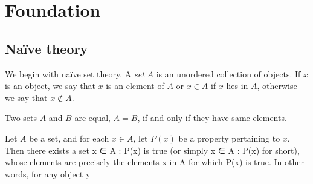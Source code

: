 
\chapter{Foundation}

\section{Na\"ive theory}

We begin with na\"ive set theory. A \emph{set} $A$ is an unordered collection of objects. If $x$ is an object, we say that $x$ is an element of $A$ or $x \in A$ if $x$ lies in $A$, otherwise we say that $x \notin A$.

\begin{axiom}[Extension]
    Two sets $A$ and $B$ are equal, $A = B$, if and only if they have same elements.
\end{axiom}

\begin{axiom}
    Let $A$ be a set, and for each $x \in A$, let $P(x)$ be a property pertaining to $x$. Then there exists a set {x ∈ A : P(x) is true} (or simply {x ∈ A : P(x)} for short), whose elements are precisely the elements x in A for which P(x) is true. In other words, for any object y
\end{axiom}



